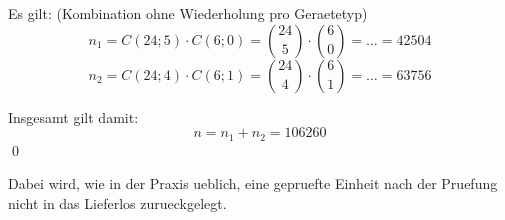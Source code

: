 \documentclass{abgabe}
\begin{document}
\begin{questions}
\begin{parts}
\begin{solution}
            Es gilt: (Kombination ohne Wiederholung pro Geraetetyp)
            \[ 
                n_1 = C(24;5) \cdot C(6;0) = \binom{24}{5} \cdot \binom{6}{0} = \ldots = \num{42504}
            \] 
            \[ 
                n_2 = C(24;4) \cdot C(6;1) = \binom{24}{4} \cdot \binom{6}{1} = \ldots = \num{63756}
            \] 

            Insgesamt gilt damit:
            \[ 
                n = n_1 + n_2 = \num{106260}
            \]
            \qed
        \end{solution}
    \end{parts}

    Dabei wird, wie in der Praxis ueblich, eine gepruefte Einheit nach der Pruefung nicht in das Lieferlos zurueckgelegt.
\end{questions}
\end{document}
